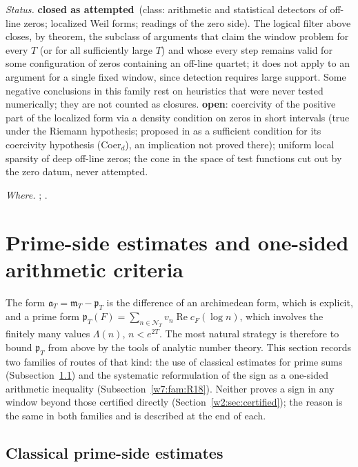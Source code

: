 \documentclass[11pt]{amsart}
\theoremstyle{definition}
\theoremstyle{remark}
\numberwithin{equation}{section}
\DeclareMathOperator{\Rel}{Re}
\newcommand{\cF}{c_F}                                  %
\newcommand{\NT}{\mathcal{N}_T}                        %
\newcommand{\mT}{\mathfrak{m}_T}                       %
\newcommand{\pT}{\mathfrak{p}_T}                       %
\newcommand{\aT}{\mathfrak{a}_T}                       %
\newcommand{\rtag}[1]{\textbf{\small\textsf{#1}}}
\newcommand{\closedA}{\rtag{closed as attempted}}
\newcommand{\openR}{\rtag{open}}
\newcommand{\entry}[1]{\par\smallskip\noindent\textit{#1.}\enspace}
\begin{document}
\entry{Status} \closedA\ (class: arithmetic and statistical detectors of off-line zeros; localized
Weil forms; readings of the zero side). The logical filter above closes, by theorem, the subclass of
arguments that claim the window problem for every $T$ (or for all sufficiently large $T$) and whose
every step remains valid for some configuration of zeros containing an off-line quartet; it does not
apply to an argument for a single fixed window, since detection requires large support. Some negative
conclusions in this family rest on heuristics that were never tested numerically; they are not counted
as closures. \openR: coercivity of the positive part of the localized form via
a density condition on zeros in short intervals (true under the Riemann hypothesis; proposed in
\cite{P08} as a sufficient condition for its coercivity hypothesis (Coer$_d$), an implication not proved
there); uniform local sparsity of deep off-line zeros; the cone in the
space of test functions cut out by the zero datum, never attempted.

\entry{Where} \cite{P02,P03,P04,P05,P07,P09,P12,P16,P18,P21,P39,P45};
\cite{DavenportHeilbronn1936,BombieriHejhal1995,Montgomery1973,Selberg1946,KeatingSnaith2000,
RudnickSarnak1996,ErdosKac1940,MontgomeryVaughan1974}.


\section{Prime-side estimates and one-sided arithmetic criteria}\label{w7:sec:primeside}

The form $\aT=\mT-\pT$ is the difference of an archimedean form, which is explicit, and a prime form
$\pT(F)=\sum_{n\in\NT}v_n\Rel\cF(\log n)$, which involves the finitely many values $\Lambda(n)$, $n<e^{2T}$. The
most natural strategy is therefore to bound $\pT$ from above by the tools of analytic number theory. This
section records two families of routes of that kind: the use of classical estimates for prime sums
(Subsection~\ref{w7:fam:R17}) and the systematic reformulation of the sign as a one-sided arithmetic inequality
(Subsection~\ref{w7:fam:R18}). Neither proves a sign in any window beyond those certified directly
(Section~\ref{w2:sec:certified}); the reason is the same in both families and is described at the end of each.

\subsection{Classical prime-side estimates}\label{w7:fam:R17}
\end{document}
